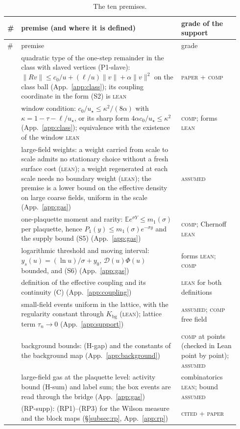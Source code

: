\documentclass[11pt,a4paper]{article}
\theoremstyle{definition}
\theoremstyle{remark}
\newcommand{\E}{\mathbb{E}}
\newcommand{\tagL}{\textsc{lean}}
\newcommand{\tagP}{\textsc{paper}}
\newcommand{\tagC}{\textsc{comp}}
\newcommand{\tagK}{\textsc{cited}}
\newcommand{\tagA}{\textsc{assumed}}
\begin{document}
{\small\begin{longtable}{@{}>{\raggedright\arraybackslash}p{0.04\linewidth}>{\raggedright\arraybackslash}p{0.66\linewidth}>{\raggedright\arraybackslash}p{0.24\linewidth}@{}}
\caption{The ten premises.}\label{tab:premises}\\\toprule
\# & premise (and where it is defined) & grade of the support\\\midrule\endfirsthead
\toprule \# & premise & grade\\\midrule\endhead
1 & quadratic type of the one-step remainder in the class with slaved vertices (P1-slave): $\|R v\|\le c_0/u+(\ell/u)\|v\|+\alpha\|v\|^2$ on the class ball (App.~\ref{app:class}); its coupling coordinate in the form (S2) is \tagL{} & \tagP{} + \tagC\\
2 & window condition: $c_0/u_\star\le\kappa^2/(8\alpha)$ with $\kappa=1-\tau-\ell/u_\star$, or its sharp form $4\alpha c_0/u_\star\le\kappa^2$ (App.~\ref{app:class}); equivalence with the existence of the window \tagL & \tagC; forms \tagL\\
3 & large-field weights: a weight carried from scale to scale admits no stationary choice without a fresh surface cost (\tagL); a weight regenerated at each scale needs no boundary weight (\tagL); the premise is a lower bound on the effective density on large coarse fields, uniform in the scale (App.~\ref{app:gas}) & \tagA\\
4 & one-plaquette moment and rarity: $\E e^{\sigma Y}\le m_1(\sigma)$ per plaquette, hence $P_1(y)\le m_1(\sigma)e^{-\sigma y}$ and the supply bound (S5) (App.~\ref{app:gas}) & \tagC; Chernoff \tagL\\
5 & logarithmic threshold and moving interval: $y_s(u)=(\ln u)/\sigma+y_0$, $\mathcal D(u)\Phi(u)$ bounded, and (S6) (App.~\ref{app:gas}) & forms \tagL; \tagC\\
6 & definition of the effective coupling and its continuity (C) (App.~\ref{app:coupling}) & \tagL{} for both definitions\\
7 & small-field events uniform in the lattice, with the regularity constant through $K_{\mathrm{bg}}$ (\tagL); lattice term $\tau_n\to0$ (App.~\ref{app:support}) & \tagA; \tagC{} free field\\
8 & background bounds: (H-gap) and the constants of the background map (App.~\ref{app:background}) & \tagC{} at points (checked in Lean point by point); \tagA\\
9 & large-field gas at the plaquette level: activity bound (H-sum) and label sum; the box events are read through the bridge (App.~\ref{app:gas}) & combinatorics \tagL; bound \tagA\\
10 & (RP-supp): (RP1)--(RP3) for the Wilson measure and the block maps (\S\ref{subsec:rp}, App.~\ref{app:rp}) & \tagK{} + \tagP\\\bottomrule
\end{longtable}}
\end{document}
